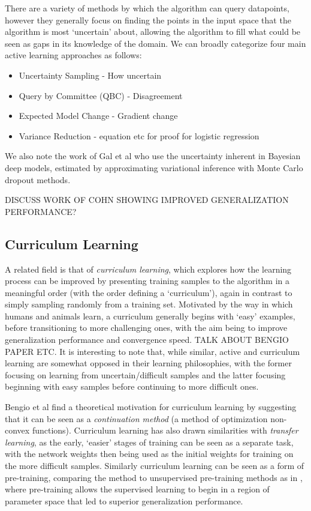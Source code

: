 \documentclass[a4paper,10.5pt]{article}
\begin{document}
There are a variety of methods by which the algorithm can query datapoints, however they generally focus on finding the points in the input space that the algorithm is most `uncertain' about, allowing the algorithm to fill what could be seen as gaps in its knowledge of the domain. We can broadly categorize four main active learning approaches as follows:
\begin{itemize}
\item Uncertainty Sampling - How uncertain
\item Query by Committee (QBC) - Disagreement
\item Expected Model Change - Gradient change
\item Variance Reduction - equation etc for proof for logistic regression
\end{itemize}
We also note the work of Gal et al \cite{Gal 2016 2} who use the uncertainty inherent in Bayesian deep models, estimated by approximating variational inference with Monte Carlo dropout methods.

DISCUSS WORK OF COHN SHOWING IMPROVED GENERALIZATION PERFORMANCE?

\subsection*{Curriculum Learning}
A related field is that of \textit{curriculum learning}, which explores how the learning process can be improved by presenting training samples to the algorithm in a meaningful order (with the order defining a `curriculum'), again in contrast to simply sampling randomly from a training set. Motivated by the way in which humans and animals learn, a curriculum generally begins with `easy' examples, before transitioning to more challenging ones, with the aim being to improve generalization performance and convergence speed. TALK ABOUT BENGIO PAPER ETC. It is interesting to note that, while similar, active and curriculum learning are somewhat opposed in their learning philosophies, with the former focusing on learning from uncertain/difficult samples and the latter focusing beginning with easy samples before continuing to more difficult ones. 

Bengio et al \cite{Bengio 09} find a theoretical motivation for curriculum learning by suggesting that it can be seen as a \textit{continuation method} (a method of optimization non-convex functions). Curriculum learning has also drawn similarities with \textit{transfer learning}, as the early, `easier' stages of training can be seen as a separate task, with the network weights then being used as the initial weights for training on the more difficult samples. Similarly curriculum learning can be seen as a form of pre-training, comparing the method to unsupervised pre-training methods as in \cite{Erhan 09}, where pre-training allows the supervised learning to begin in a region of parameter space that led to superior generalization performance. 
\end{document}
